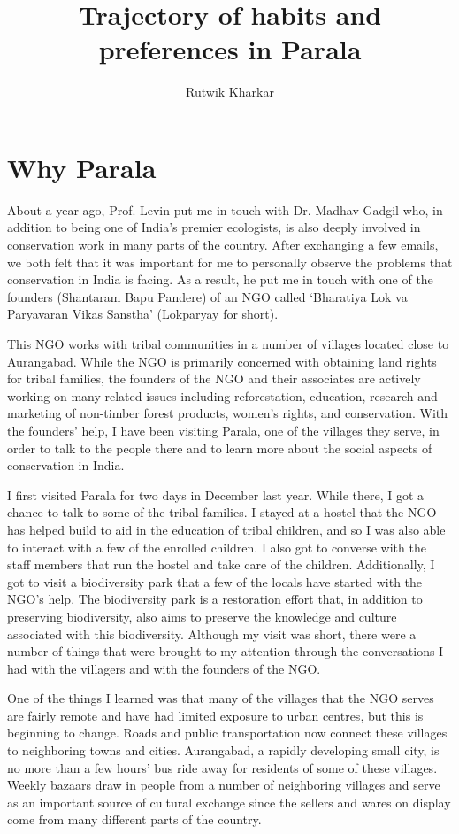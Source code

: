 \documentclass{report}
\title{Trajectory of habits and preferences in Parala}
\author{Rutwik Kharkar}
\begin{document}
\maketitle

\chapter*{Why Parala}

About a year ago, Prof. Levin put me in touch with Dr. Madhav Gadgil who, in addition to being one of India's premier ecologists, is also deeply involved in conservation work in many parts of the country. After exchanging a few emails, we both felt that it was important for me to personally observe the problems that conservation in India is facing. As a result, he put me in touch with one of the founders (Shantaram Bapu Pandere) of an NGO called `Bharatiya Lok va Paryavaran Vikas Sanstha' (Lokparyay for short).

This NGO works with tribal communities in a number of villages located close to Aurangabad. While the NGO is primarily concerned with obtaining land rights for tribal families, the founders of the NGO and their associates are actively working on many related issues including reforestation, education, research and marketing of non-timber forest products, women's rights, and conservation. With the founders' help, I have been visiting Parala, one of the villages they serve, in order to talk to the people there and to learn more about the social aspects of conservation in India.

I first visited Parala for two days in December last year. While there, I got a chance to talk to some of the tribal families. I stayed at a hostel that the NGO has helped build to aid in the education of tribal children, and so I was also able to interact with a few of the enrolled children. I also got to converse with the staff members that run the hostel and take care of the children. Additionally, I got to visit a biodiversity park that a few of the locals have started with the NGO's help. The biodiversity park is a restoration effort that, in addition to preserving biodiversity, also aims to preserve the knowledge and culture associated with this biodiversity. Although my visit was short, there were a number of things that were brought to my attention through the conversations I had with the villagers and with the founders of the NGO.

One of the things I learned was that many of the villages that the NGO serves are fairly remote and have had limited exposure to urban centres, but this is beginning to change. Roads and public transportation now connect these villages to neighboring towns and cities. Aurangabad, a rapidly developing small city, is no more than a few hours' bus ride away for residents of some of these villages. Weekly bazaars draw in people from a number of neighboring villages and serve as an important source of cultural exchange since the sellers and wares on display come from many different parts of the country.
\end{document}
